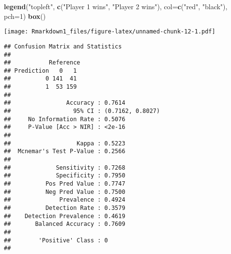 \documentclass[]{article}
\newenvironment{Shaded}{\begin{snugshade}}{\end{snugshade}}
\newcommand{\KeywordTok}[1]{\textcolor[rgb]{0.13,0.29,0.53}{\textbf{#1}}}
\newcommand{\DataTypeTok}[1]{\textcolor[rgb]{0.13,0.29,0.53}{#1}}
\newcommand{\DecValTok}[1]{\textcolor[rgb]{0.00,0.00,0.81}{#1}}
\newcommand{\CharTok}[1]{\textcolor[rgb]{0.31,0.60,0.02}{#1}}
\newcommand{\StringTok}[1]{\textcolor[rgb]{0.31,0.60,0.02}{#1}}
\newcommand{\CommentTok}[1]{\textcolor[rgb]{0.56,0.35,0.01}{\textit{#1}}}
\newcommand{\OperatorTok}[1]{\textcolor[rgb]{0.81,0.36,0.00}{\textbf{#1}}}
\newcommand{\NormalTok}[1]{#1}
\begin{document}
\begin{Shaded}
\begin{Highlighting}[]
\KeywordTok{legend}\NormalTok{(}\StringTok{"topleft"}\NormalTok{, }\KeywordTok{c}\NormalTok{(}\StringTok{"Player 1 wins"}\NormalTok{, }\StringTok{"Player 2 wins"}\NormalTok{), }
       \DataTypeTok{col=}\KeywordTok{c}\NormalTok{(}\StringTok{"red"}\NormalTok{, }\StringTok{"black"}\NormalTok{), }\DataTypeTok{pch=}\DecValTok{1}\NormalTok{)}
\KeywordTok{box}\NormalTok{()}
\end{Highlighting}
\end{Shaded}

\texttt{[image: Rmarkdown1\_files/figure-latex/unnamed-chunk-12-1.pdf]}

\begin{Shaded}
\end{Shaded}

\begin{verbatim}
## Confusion Matrix and Statistics
## 
##           Reference
## Prediction   0   1
##          0 141  41
##          1  53 159
##                                           
##                Accuracy : 0.7614          
##                  95% CI : (0.7162, 0.8027)
##     No Information Rate : 0.5076          
##     P-Value [Acc > NIR] : <2e-16          
##                                           
##                   Kappa : 0.5223          
##  Mcnemar's Test P-Value : 0.2566          
##                                           
##             Sensitivity : 0.7268          
##             Specificity : 0.7950          
##          Pos Pred Value : 0.7747          
##          Neg Pred Value : 0.7500          
##              Prevalence : 0.4924          
##          Detection Rate : 0.3579          
##    Detection Prevalence : 0.4619          
##       Balanced Accuracy : 0.7609          
##                                           
##        'Positive' Class : 0               
## 
\end{verbatim}

\begin{Shaded}
\end{Shaded}
\end{document}
